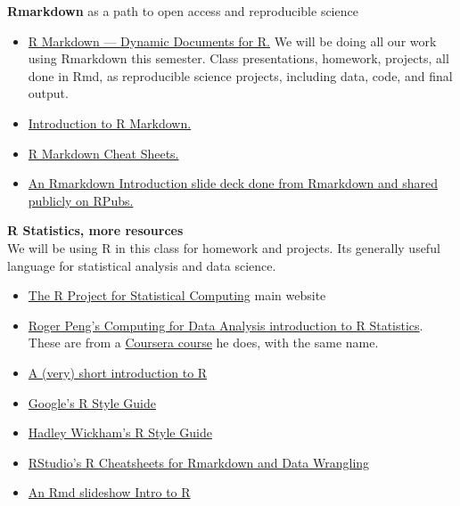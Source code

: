 \documentclass[11pt]{article} %
\begin{document}
  {\bf Rmarkdown} as a path to open access and reproducible science
    \begin{itemize}
    	\item \href{"http://rmarkdown.rstudio.com/"}{ R Markdown — Dynamic Documents for R.} We will be doing all our work using Rmarkdown this semester.  Class presentations, homework, projects, all done in Rmd, as reproducible science projects, including data, code, and final output.  
    	\item \href{"http://shiny.rstudio.com/articles/rmarkdown.html"}{ Introduction to R Markdown.}
    	\item \href{"http://www.rstudio.com/resources/cheatsheets/"}{ R Markdown Cheat Sheets.}
    	\item \href{"http://rpubs.com/mansun_kuo/24330"}{ An Rmarkdown Introduction slide deck done from Rmarkdown and shared publicly on RPubs.}
    \end{itemize}
  
  {\bf R Statistics, more resources} \\
      We will be using R in this class for homework and projects.  
      Its generally useful language for statistical analysis and data science. 
    \begin{itemize}
    	\item \href{"http://www.r-project.org/index.html"}{The R Project for Statistical Computing}  \cite{r_r_2014} main website
    	\item \href{"https://www.youtube.com/user/rdpeng/playlists"}{Roger Peng's Computing for Data Analysis introduction to R Statistics}. These are from a \href{"https://www.coursera.org/course/compdata"} {Coursera course} he does, with the same name. \cite{peng_computing_2014}\item \href{"http://cran.r-project.org/doc/contrib/Torfs+Brauer-Short-R-Intro.pdf"}{A (very) short introduction to R}  \cite{torfs_very_2014}
    	\item \href{"https://google-styleguide.googlecode.com/svn/trunk/Rguide.xml"}{ Google's R Style Guide}
    	\item \href{"http://stat405.had.co.nz/r-style.html"}{ Hadley Wickham's R Style Guide}  
    	\item \href{"http://www.rstudio.com/resources/cheatsheets/"}{ RStudio's R Cheatsheets for Rmarkdown and Data Wrangling}
    	\item \href{"http://www.theresearchkitchen.com/blog"}{An Rmd slideshow Intro to R}
    \end{itemize}
  
\end{document}
